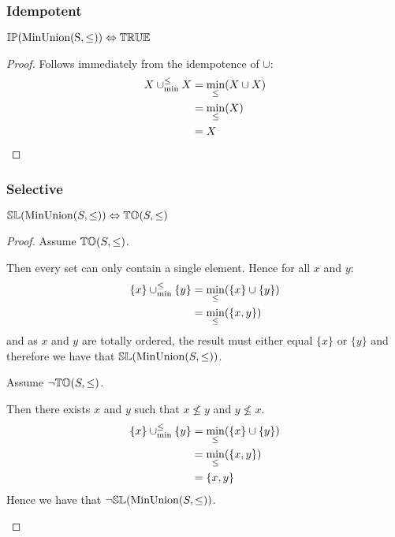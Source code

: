 \documentclass[../Summary.tex]{subfiles}
\begin{document}
\subsubsection{Idempotent}

\begin{theorem} \label{thm:minunion_ip}
${\mathbb{IP}}(\mathrm{MinUnion(S,\leq)}) \Leftrightarrow {\mathbb{TRUE}}$
\end{theorem}

\begin{proof}
Follows immediately from the idempotence of $\cup$:
\begin{align*}
X \mathbin{\cup_{\min}^{\leq}} X 	& = \min_\leq(X \cup X) \\
				& = \min_\leq(X) \\
				& = X
\end{align*}
\end{proof}





\subsubsection{Selective}

\begin{theorem} \label{thm:minunion_sl}
${\mathbb{SL}}(\mathrm{MinUnion}(S,\leq)) \Leftrightarrow {\mathbb{TO}}(S,\leq)$
\end{theorem}

\begin{proof}
Assume ${\mathbb{TO}}(S,\leq)$.

\begin{ind}
Then every set can only contain a single element. Hence for all $x$ and $y$:
\begin{align*}
\{ x \} \mathbin{\cup_{\min}^{\leq}} \{ y \} 	& = \min_\leq(\{ x \} \cup \{ y \}) \\
							& = \min_\leq(\{ x , y \}) 
\end{align*}
and as $x$ and $y$ are totally ordered, the result must either equal $\{ x \}$ or $\{ y \}$ and therefore we have that ${\mathbb{SL}}(\mathrm{MinUnion}(S,\leq))$.
\end{ind}

Assume $\neg {\mathbb{TO}}(S,\leq)$.

\begin{ind}
Then there exists $x$ and $y$ such that $x \nleq y$ and $y \nleq x$.
\begin{align*}
\{ x \} \mathbin{\cup_{\min}^{\leq}} \{ y \} 	& = \min_\leq(\{ x \} \cup \{ y \}) \\
							& = \min_\leq(\{ x , y \}) \\
							& = \{ x , y \}
\end{align*}
Hence we have that $\neg {\mathbb{SL}}(\mathrm{MinUnion}(S,\leq))$.
\end{ind}
\end{proof}
\end{document}
